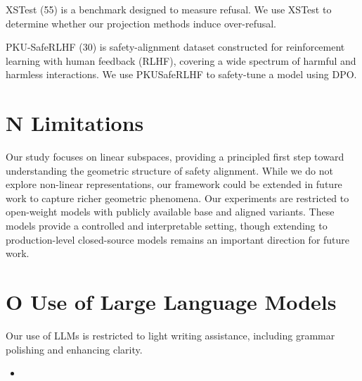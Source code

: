 \documentclass[10pt]{article}
\begin{document}
XSTest (55) is a benchmark designed to measure refusal. We use XSTest to determine whether our projection methods induce over-refusal.

PKU-SafeRLHF (30) is safety-alignment dataset constructed for reinforcement learning with human feedback (RLHF), covering a wide spectrum of harmful and harmless interactions. We use PKUSafeRLHF to safety-tune a model using DPO.

\section*{N Limitations}
Our study focuses on linear subspaces, providing a principled first step toward understanding the geometric structure of safety alignment. While we do not explore non-linear representations, our framework could be extended in future work to capture richer geometric phenomena. Our experiments are restricted to open-weight models with publicly available base and aligned variants. These models provide a controlled and interpretable setting, though extending to production-level closed-source models remains an important direction for future work.

\section*{O Use of Large Language Models}
Our use of LLMs is restricted to light writing assistance, including grammar polishing and enhancing clarity.

\begin{itemize}
  \item 
\end{itemize}
\end{document}

